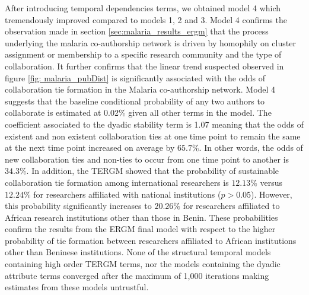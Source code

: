 After introducing temporal dependencies terms, we obtained model 4 which tremendously improved compared to models 1, 2 and 3. Model 4 confirms the observation made in section \ref{sec:malaria_results_ergm} that the process underlying the malaria co-authorship network is driven by homophily on cluster assignment or membership to a specific research community and the type of collaboration. It further confirms that the linear trend suspected observed in figure \ref{fig: malaria_pubDist} is significantly associated with the odds of collaboration tie formation in the Malaria co-authorship network. Model 4 suggests that the baseline conditional probability of any two authors to collaborate is estimated at 0.02\% given all other terms in the model. The coefficient associated to the dyadic stability term is 1.07 meaning that the odds of existent and non existent collaboration ties at one time point to remain the same at the next time point increased on average by $65.7\%$. In other words, the odds of new collaboration ties and non-ties to occur from one time point to another is $34.3\%$. In addition, the TERGM showed that the probability of sustainable collaboration tie formation among international researchers is $12.13\%$ versus $12.24\%$ for researchers affiliated with national institutions ($p>0.05$). However, this probability significantly increases to $20.26\%$ for researchers affiliated to African research institutions other than those in Benin. These probabilities confirm the results from the ERGM final model with respect to the higher probability of tie formation between researchers affiliated to African institutions other than Beninese institutions. None of the structural temporal models containing high order TERGM terms, nor the models containing the dyadic attribute terms converged after the maximum of 1,000 iterations making estimates from these models untrustful.\\

